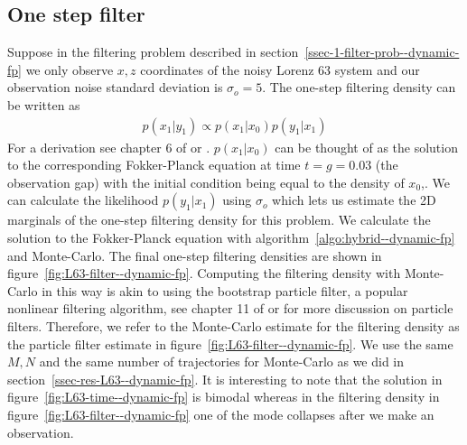 \subsection{One step filter}
Suppose in the filtering problem described in section~\ref{ssec-1-filter-prob--dynamic-fp} we only observe $x,z$ coordinates of the noisy Lorenz 63 system and our observation noise standard deviation is $\sigma_o=5$. The one-step filtering density can be written as 
\begin{align}
    p(x_1|y_1) \propto p(x_1|x_0)p(y_1|x_1)
\end{align}
For a derivation see chapter 6 of \cite{sarkka2023bayesian} or \cite{doucet2009tutorial}. $p(x_1| x_0)$ can be thought of as the solution to the corresponding Fokker-Planck equation at time $t=g=0.03$ (the observation gap) with the initial condition being equal to the density of $x_0$,. We can calculate the likelihood $p(y_1|x_1)$ using $\sigma_o$ which lets us estimate the 2D marginals of the one-step filtering density for this problem. We calculate the solution to the Fokker-Planck equation with algorithm~\ref{algo:hybrid--dynamic-fp} and Monte-Carlo. The final one-step filtering densities are shown in figure~\ref{fig:L63-filter--dynamic-fp}. Computing the filtering density with Monte-Carlo in this way is akin to using the bootstrap particle filter, a popular nonlinear filtering algorithm, see chapter 11 of \cite{sarkka2023bayesian} or \cite{doucet2009tutorial} for more discussion on particle filters. Therefore, we refer to the Monte-Carlo estimate for the filtering density as the particle filter estimate in figure~\ref{fig:L63-filter--dynamic-fp}. We use the same $M, N$ and the same number of trajectories for Monte-Carlo as we did in section~\ref{ssec-res-L63--dynamic-fp}. It is interesting to note that the solution in figure~\ref{fig:L63-time--dynamic-fp} is bimodal whereas in the filtering density in figure~\ref{fig:L63-filter--dynamic-fp} one of the mode collapses after we make an observation.

